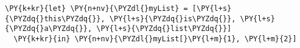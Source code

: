 \begin{Verbatim}[commandchars=\\\{\}]
\PY{k+kr}{let} \PY{n+nv}{\PYZdl{}myList} = [\PY{l+s}{\PYZdq{}this\PYZdq{}}, \PY{l+s}{\PYZdq{}is\PYZdq{}}, \PY{l+s}{\PYZdq{}a\PYZdq{}}, \PY{l+s}{\PYZdq{}list\PYZdq{}}]
  \PY{k+kr}{in} \PY{n+nv}{\PYZdl{}myList[}\PY{l+m}{1}, \PY{l+m}{2}]
\end{Verbatim}
